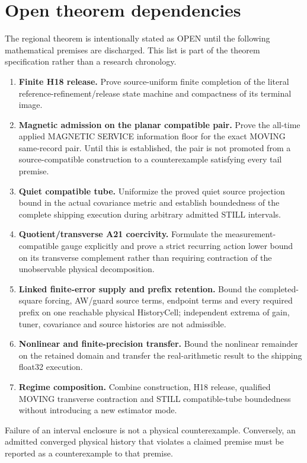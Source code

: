 \documentclass[journal]{IEEEtran}
\begin{document}
\section{Open theorem dependencies}
The regional theorem is intentionally stated as OPEN until the following
mathematical premises are discharged.  This list is part of the theorem
specification rather than a research chronology.
\begin{enumerate}
\item \textbf{Finite H18 release.}  Prove source-uniform finite completion of
the literal reference-refinement/release state machine and compactness of its
terminal image.
\item \textbf{Magnetic admission on the planar compatible pair.}  Prove the
all-time applied MAGNETIC SERVICE information floor for the exact MOVING
same-record pair.  Until this is established, the pair is not promoted from a
source-compatible construction to a counterexample satisfying every tail
premise.
\item \textbf{Quiet compatible tube.}  Uniformize the proved quiet source
projection bound in the actual covariance metric and establish boundedness of
the complete shipping execution during arbitrary admitted STILL intervals.
\item \textbf{Quotient/transverse A21 coercivity.}  Formulate the
measurement-compatible gauge explicitly and prove a strict recurring action
lower bound on its transverse complement rather than requiring contraction of
the unobservable physical decomposition.
\item \textbf{Linked finite-error supply and prefix retention.}  Bound the
completed-square forcing, AW/guard source terms, endpoint terms and every
required prefix on one reachable physical HistoryCell; independent extrema of
gain, tuner, covariance and source histories are not admissible.
\item \textbf{Nonlinear and finite-precision transfer.}  Bound the nonlinear
remainder on the retained domain and transfer the real-arithmetic result to
the shipping float32 execution.
\item \textbf{Regime composition.}  Combine construction, H18 release,
qualified MOVING transverse contraction and STILL compatible-tube boundedness
without introducing a new estimator mode.
\end{enumerate}
Failure of an interval enclosure is not a physical counterexample.  Conversely,
an admitted converged physical history that violates a claimed premise must be
reported as a counterexample to that premise.
\end{document}
